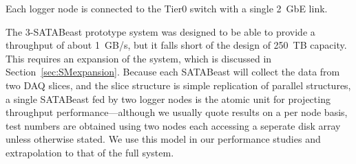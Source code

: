 Each logger node is connected to the Tier0 switch with a single 2~GbE link.  

The 3-SATABeast prototype system was designed to be able to provide a throughput of about 1~GB/s,
but it falls short of the design of 250~TB capacity. 
This requires an expansion of the system, which is discussed in Section~\ref{sec:SMexpansion}.
Because each SATABeast will collect the data from two DAQ slices, and the slice structure
is simple replication of parallel structures, a single SATABeast fed by two logger nodes
is the atomic unit for projecting throughput performance---although we usually quote
results on a per node basis, test numbers are
obtained using two nodes each accessing a seperate disk array unless otherwise stated.
We use this model in our performance studies and extrapolation to that of the full system.


